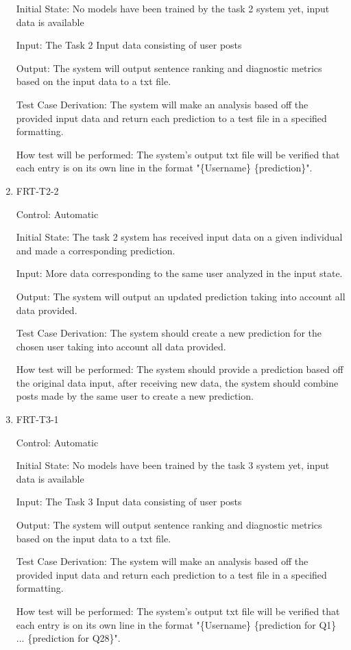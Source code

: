 \documentclass[12pt, titlepage]{article}
\begin{document}
\begin{enumerate}
Initial State: No models have been trained by the task 2 system yet, input data is available

Input: The Task 2 Input data consisting of user posts

Output: The system will output sentence ranking and diagnostic metrics based on the input data to a txt file.

Test Case Derivation: The system will make an analysis based off the provided input data and return each prediction to a test file in a specified formatting.

How test will be performed: The system's output txt file will be verified that each entry is on its own line in the format "\{Username\} \{prediction\}".

\item{FRT-T2-2\\}

Control: Automatic

Initial State: The task 2 system has received input data on a given individual and made a corresponding prediction.

Input: More data corresponding to the same user analyzed in the input state.

Output: The system will output an updated prediction taking into account all data provided.

Test Case Derivation: The system should create a new prediction for the chosen user taking into account all data provided.

How test will be performed: The system should provide a prediction based off the original data input, after receiving new data, the system should combine posts made by the same user to create a new prediction. 

\item{FRT-T3-1\\}

Control: Automatic

Initial State: No models have been trained by the task 3 system yet, input data is available

Input: The Task 3 Input data consisting of user posts

Output: The system will output sentence ranking and diagnostic metrics based on the input data to a txt file.

Test Case Derivation: The system will make an analysis based off the provided input data and return each prediction to a test file in a specified formatting.

How test will be performed: The system's output txt file will be verified that each entry is on its own line in the format "\{Username\} \{prediction for Q1\} ... \{prediction for Q28\}".

\end{enumerate}
\end{document}
